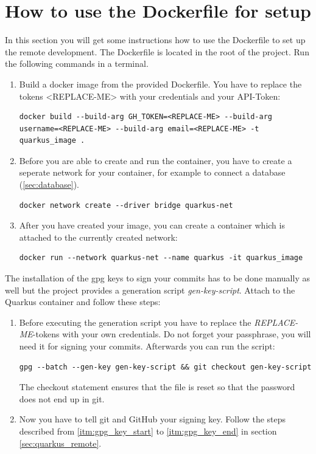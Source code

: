     \section{How to use the Dockerfile for setup}\label{sec:dockerfile}
        In this section you will get some instructions how to use the Dockerfile to set up the remote development. The Dockerfile is located in the root of the project. 
        Run the following commands in a terminal. 
        \begin{enumerate}
            \item Build a docker image from the provided Dockerfile. You have to replace the tokens <REPLACE-ME> with your credentials and your API-Token:
            \begin{lstlisting}[style=bash]
docker build --build-arg GH_TOKEN=<REPLACE-ME> --build-arg username=<REPLACE-ME> --build-arg email=<REPLACE-ME> -t quarkus_image .
            \end{lstlisting}
            \item \label{item:network} Before you are able to create and run the container, you have to create a seperate network for your container, for example to connect a database (\ref{sec:database}). 
            \begin{lstlisting}[style=bash]
docker network create --driver bridge quarkus-net
            \end{lstlisting}
            \item After you have created your image, you can create a container which is attached to the currently created network:
            \begin{lstlisting}[style=bash]
docker run --network quarkus-net --name quarkus -it quarkus_image
            \end{lstlisting} 
        \end{enumerate}
        The installation of the gpg keys to sign your commits has to be done manually as well but the project provides a generation script \textit{gen-key-script}. Attach to the Quarkus container and follow these steps: 
        \begin{enumerate}
            \item Before executing the generation script you have to replace the \textit{REPLACE-ME}-tokens with your own credentials. Do not forget your passphrase, you will need it for signing your commits. Afterwards you can run the script: 
            \begin{lstlisting}[style=bash]
gpg --batch --gen-key gen-key-script && git checkout gen-key-script
            \end{lstlisting}
            The checkout statement ensures that the file is reset so that the password does not end up in git.
            \item Now you have to tell git and GitHub your signing key. Follow the steps described from \ref{itm:gpg_key_start} to \ref{itm:gpg_key_end} in section \ref{sec:quarkus_remote}.
        \end{enumerate}
        

